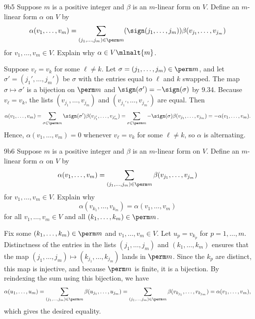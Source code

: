 \begin{exercise}{9b5}
    Suppose $m$ is a positive integer and $\beta$ is an $m$-linear form on $V$.
    Define an $m$-linear form $\alpha$ on $V$ by
    \[
        \alpha(v_1, \ldots, v_m) = \sum_{(j_1, \ldots, j_m) \in \perm m} (\sign(j_1, \ldots, j_m)) \beta(v_{j_1}, \ldots, v_{j_m})
    \]
    for $v_1, \ldots, v_m \in V$.
    Explain why $\alpha \in V\mlnalt{m}$.
\end{exercise}

\begin{sol}
    Suppose $v_\ell = v_k$ for some $\ell \neq k$.
    Let $\sigma = (j_1, \ldots, j_m) \in \perm m$, and let $\sigma' = (j_1', \ldots, j_m')$ be $\sigma$ with the entries equal to $\ell$ and $k$ swapped.
    The map $\sigma \mapsto \sigma'$ is a bijection on $\perm m$ and $\sign(\sigma') = -\sign(\sigma)$ by 9.34.
    Because $v_\ell = v_k$, the lists $(v_{j_1}, \ldots, v_{j_m})$ and $(v_{j_1'}, \ldots, v_{j_m'})$ are equal.
    Then
    \[
        \alpha(v_1, \ldots, v_m) = \sum_{\sigma \in \perm m} \sign(\sigma') \beta(v_{j_1'}, \ldots, v_{j_m'}) = \sum_{\sigma \in \perm m} -\sign(\sigma) \beta(v_{j_1}, \ldots, v_{j_m}) = -\alpha(v_1, \ldots, v_m).
    \]
    Hence, $\alpha(v_1, \ldots, v_m) = 0$ whenever $v_\ell = v_k$ for some $\ell \neq k$, so $\alpha$ is alternating.
\end{sol}

\begin{exercise}{9b6}
    Suppose $m$ is a positive integer and $\beta$ is an $m$-linear form on $V$.
    Define an $m$-linear form $\alpha$ on $V$ by
    \[
        \alpha(v_1, \ldots, v_m) = \sum_{(j_1, \ldots, j_m) \in \perm m} \beta(v_{j_1}, \ldots, v_{j_m})
    \]
    for $v_1, \ldots, v_m \in V$.
    Explain why
    \[
        \alpha(v_{k_1}, \ldots, v_{k_m}) = \alpha(v_1, \ldots, v_m)
    \]
    for all $v_1, \ldots, v_m \in V$ and all $(k_1, \ldots, k_m) \in \perm m$.
\end{exercise}

\begin{sol}
    Fix some $(k_1, \ldots, k_m) \in \perm m$ and $v_1, \ldots, v_m \in V$.
    Let $u_p = v_{k_p}$ for $p = 1, \ldots, m$.
    Distinctness of the entries in the lists $(j_1, \ldots, j_m)$ and $(k_1, \ldots, k_m)$ ensures that the map $(j_1, \ldots, j_m) \mapsto (k_{j_1}, \ldots, k_{j_m})$ lands in $\perm m$.
    Since the $k_p$ are distinct, this map is injective, and because $\perm m$ is finite, it is a bijection.
    By reindexing the sum using this bijection, we have
    \[
        \alpha(u_1, \ldots, u_m) = \sum_{(j_1, \ldots, j_m) \in \perm m} \beta(u_{j_1}, \ldots, u_{j_m}) = \sum_{(j_1, \ldots, j_m) \in \perm m} \beta(v_{k_{j_1}}, \ldots, v_{k_{j_m}}) = \alpha(v_1, \ldots, v_m),
    \]
    which gives the desired equality.
\end{sol}

